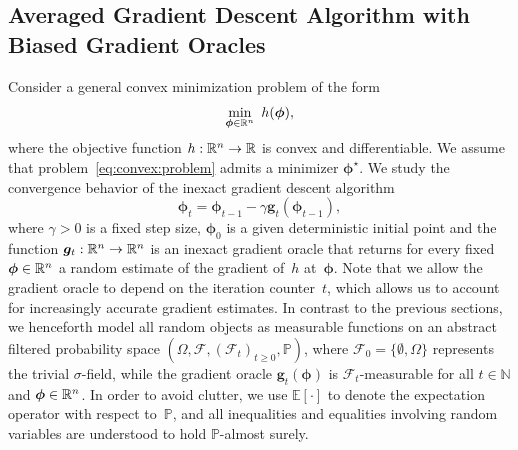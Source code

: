 \documentclass[11pt, a4paper, oneside, reqno]{article}
\begin{document}
	\subsection{Averaged Gradient Descent Algorithm with Biased Gradient Oracles}
	\label{section:AGD}	
	Consider a general convex minimization problem of the form
	\begin{equation}
	\label{eq:convex:problem}
	\min_{\bm \phi \in \mathbb{R}^n} ~ h(\bm \phi),
	\end{equation}
	where the objective function $h: \mathbb{R}^n \to \mathbb{R}$ is convex and differentiable. We assume that problem~\eqref{eq:convex:problem} admits a minimizer $\bm \phi^\star$. We study the convergence behavior of the inexact gradient descent algorithm
	\begin{equation} \label{eq:gd}
	\bm \phi_{t} = \bm \phi_{t-1} - \gamma \bm g_t(\bm \phi_{t-1}),
	\end{equation}
	where $\gamma > 0$ is a fixed step size, $\bm \phi_0$ is a given deterministic initial point and the function $\bm g_t: \mathbb{R}^n \to \mathbb{R}^n$ is an inexact gradient oracle that returns for every fixed $\bm \phi\in\mathbb{R}^n$ a random estimate of the gradient of~$h$ at~$\bm \phi$. Note that we allow the gradient oracle to depend on the iteration counter~$t$, which allows us to account for increasingly accurate gradient estimates. In contrast to the previous sections, we henceforth model all random objects as measurable functions on an abstract filtered probability space $(\Omega, \mathcal F, (\mathcal F_t)_{t \geq 0}, \mathbb P)$, where $\mathcal{F}_0 = \{ \emptyset,\Omega \}$ represents the trivial $\sigma$-field, while the gradient oracle $\bm g_t(\bm \phi)$ is $\mathcal F_t$-measurable for all $t\in\mathbb N$ and $\bm \phi \in\mathbb{R}^n$. In order to avoid clutter, we use $\mathbb E[\cdot]$ to denote the expectation operator with respect to~$\mathbb P$, and all inequalities and equalities involving random variables are understood to hold $\mathbb P$-almost surely.
	
\end{document}
